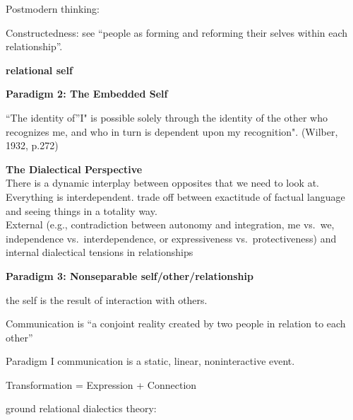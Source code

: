 \documentclass[
]{book}
\begin{document}
Postmodern thinking:

Constructedness: see ``people as forming and reforming their selves within each relationship''.

\textbf{relational self}

\textbf{Paradigm 2: The Embedded Self}

``The identity of''I" is possible solely through the identity of the other who recognizes me, and who in turn is
dependent upon my recognition". (Wilber, 1932, p.272)

\textbf{The Dialectical Perspective}\\
There is a dynamic interplay between opposites that we need to look at. Everything is interdependent. trade off between
exactitude of factual language and seeing things in a totality way.\\
External (e.g., contradiction between autonomy and integration, me vs.~we, independence vs.~interdependence, or
expressiveness vs.~protectiveness) and internal dialectical tensions in relationships

\textbf{Paradigm 3: Nonseparable self/other/relationship}

the self is the result of interaction with others.

Communication is ``a conjoint reality created by two people in relation to each other''

Paradigm I \textbar{} communication is a static, linear, noninteractive event.

Transformation = Expression + Connection

\citep{Baxter_2004}

ground relational dialectics theory:
\end{document}
